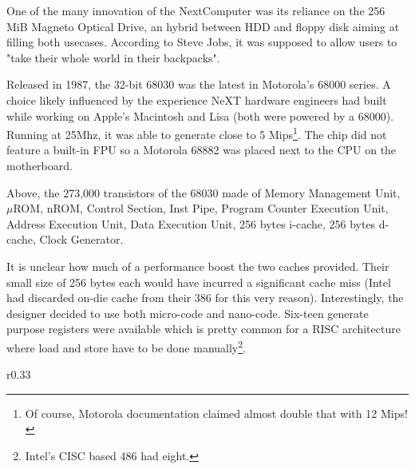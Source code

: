 \begin{figure}[H]
\centering
{}
\end{figure}
\par
One of the many innovation of the NextComputer was its reliance on the 256 MiB Magneto Optical Drive, an hybrid between HDD and floppy disk aiming at filling both usecases. According to Steve Jobs, it was supposed to allow users to "take their whole world in their backpacks".\\
\par
Released in 1987, the 32-bit 68030 was the latest in Motorola's 68000 series. A choice likely influenced by the experience NeXT hardware engineers had built while working on Apple's Macintosh and Lisa (both were powered by a 68000). Running at 25Mhz, it was able to generate close to 5 Mips\footnote{Of course, Motorola documentation claimed almost double that with 12 Mips!}. The chip did not feature a built-in FPU so a Motorola 68882 was placed next to the CPU on the motherboard.



\begin{figure}[H]
\centering
{}
\end{figure}
\par
Above, the 273,000 transistors of the 68030 made of  Memory Management Unit,  $\mu$ROM,  nROM,  Control Section,  Inst Pipe,  Program Counter Execution Unit,  Address Execution Unit,  Data Execution Unit,  256 bytes i-cache,  256 bytes d-cache,  Clock Generator.\\         
\par
It is unclear how much of a performance boost the two caches provided. Their small size of 256 bytes each would have incurred a significant cache miss (Intel had discarded on-die cache from their 386 for this very reason). Interestingly, the designer decided to use both micro-code and nano-code. Six-teen generate purpose registers were available which is pretty common for a RISC architecture where load and store have to be done manually\footnote{Intel's CISC based 486 had eight.}.
\pagebreak
 


\begin{wrapfigure}[9]{r}{0.33\textwidth}
\centering
{}
\end{wrapfigure}


